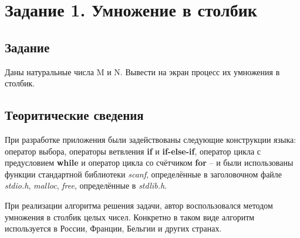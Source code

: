 \documentclass[12pt,a4paper]{report}
\begin{document}
\section{Задание 1. Умножение в столбик}
\subsection{Задание}
\hspace{\parindent}
Даны натуральные числа M и N. Вывести на экран процесс их умножения в столбик.
\subsection{Теоритические сведения}
\hspace{\parindent}
При разработке приложения были задействованы следующие конструкции языка: оператор выбора, операторы ветвления \textbf{if} и \textbf{if-else-if}, оператор цикла с предусловием \textbf{while} и оператор цикла со счётчиком \textbf{for} -- и были использованы функции стандартной библиотеки \textit{scanf}, определённые в заголовочном файле \textit{stdio.h}, \textit{malloc}, \textit{free}, определённые в \textit{stdlib.h}.

\hspace{\parindent}
При реализации алгоритма решения задачи, автор воспользовался методом умножения в столбик целых чисел. Конкретно в таком виде алгоритм используется в России, Франции, Бельгии и других странах.
\end{document}
